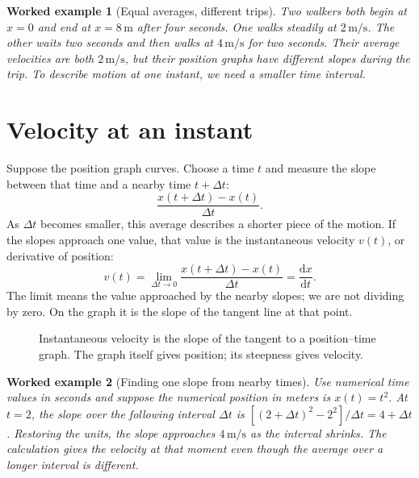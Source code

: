 \documentclass[11pt,oneside]{book}
\newcommand{\dd}{\mathrm{d}}
\newcommand{\od}[2]{\frac{\dd #1}{\dd #2}}
\theoremstyle{reviewstyle}
\newtheorem{example}{Worked example}[chapter]
\begin{document}
\begin{example}[Equal averages, different trips]
Two walkers both begin at $x=0$ and end at $x=8\,\mathrm m$ after four seconds. One walks steadily at $2\,\mathrm{m/s}$. The other waits two seconds and then walks at $4\,\mathrm{m/s}$ for two seconds. Their average velocities are both $2\,\mathrm{m/s}$, but their position graphs have different slopes during the trip. To describe motion at one instant, we need a smaller time interval.
\end{example}

\section{Velocity at an instant}
Suppose the position graph curves. Choose a time $t$ and measure the slope between that time and a nearby time $t+\Delta t$:
\begin{equation}
\frac{x(t+\Delta t)-x(t)}{\Delta t}.
\end{equation}
As $\Delta t$ becomes smaller, this average describes a shorter piece of the motion. If the slopes approach one value, that value is the instantaneous velocity $v(t)$, or derivative of position:
\begin{equation}
v(t)=\lim_{\Delta t\to0}\frac{x(t+\Delta t)-x(t)}{\Delta t}
=\od{x}{t}.
\end{equation}
The limit means the value approached by the nearby slopes; we are not dividing by zero. On the graph it is the slope of the tangent line at that point.

\begin{figure}[ht]
\centering
{}
\caption{Instantaneous velocity is the slope of the tangent to a position--time graph. The graph itself gives position; its steepness gives velocity.}
\end{figure}

\begin{example}[Finding one slope from nearby times]
Use numerical time values in seconds and suppose the numerical position in meters is $x(t)=t^2$. At $t=2$, the slope over the following interval $\Delta t$ is $[(2+\Delta t)^2-2^2]/\Delta t=4+\Delta t$. Restoring the units, the slope approaches $4\,\mathrm{m/s}$ as the interval shrinks. The calculation gives the velocity at that moment even though the average over a longer interval is different.
\end{example}
\end{document}
